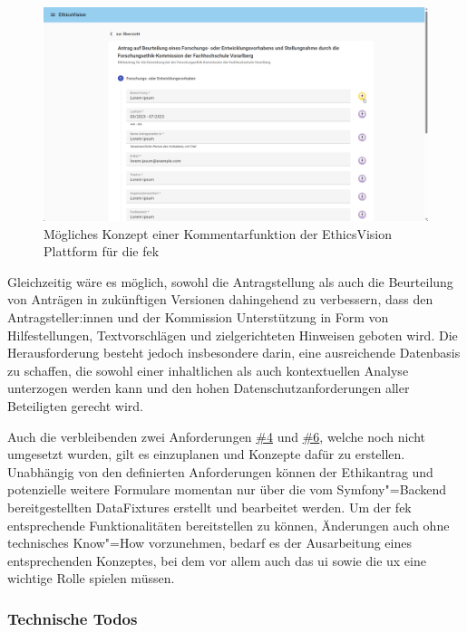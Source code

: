 \documentclass[a4paper,12pt,twoside]{scrreprt}
\begin{document}
\begin{figure}[ht]
    \centering
    \includegraphics[width=\linewidth]{thesis/images/Luidold_EthicsVision-Kommentar-Vorschau.pdf}
    \caption{Mögliches Konzept einer Kommentarfunktion der EthicsVision Plattform für die \acl{fek}}
    \label{fig:ethics-vision-kommentarfunktion}
\end{figure}

Gleichzeitig wäre es möglich, sowohl die Antragstellung als auch die Beurteilung von Anträgen in zukünftigen Versionen dahingehend zu verbessern, dass den Antragsteller:innen und der Kommission Unterstützung in Form von Hilfestellungen, Textvorschlägen und zielgerichteten Hinweisen geboten wird. Die Herausforderung besteht jedoch insbesondere darin, eine ausreichende Datenbasis zu schaffen, die sowohl einer inhaltlichen als auch kontextuellen Analyse unterzogen werden kann und den hohen Datenschutzanforderungen aller Beteiligten gerecht wird.

Auch die verbleibenden zwei Anforderungen \hyperref[sub-sub-sec:abgeleitete-anforderungen-während-erstellung-einreichung]{\#4} und \hyperref[sub-sub-sec:abgeleitete-anforderungen-während-erstellung-einreichung]{\#6}, welche noch nicht umgesetzt wurden, gilt es einzuplanen und Konzepte dafür zu erstellen. Unabhängig von den definierten Anforderungen können der Ethikantrag und potenzielle weitere Formulare momentan nur über die vom Symfony"=Backend bereitgestellten DataFixtures erstellt und bearbeitet werden. Um der \ac{fek} entsprechende Funktionalitäten bereitstellen zu können, Änderungen auch ohne technisches Know"=How vorzunehmen, bedarf es der Ausarbeitung eines entsprechenden Konzeptes, bei dem vor allem auch das \ac{ui} sowie die \ac{ux} eine wichtige Rolle spielen müssen.

\subsubsection*{Technische Todos}
\end{document}

